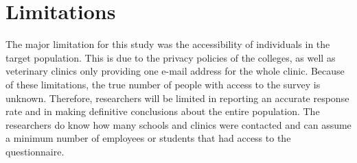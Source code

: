 \section{Limitations}

The major limitation for this study was the accessibility of individuals in the target population. This is due to the privacy policies of the colleges, as well as veterinary clinics only providing one e-mail address for the whole clinic. Because of these limitations, the true number of people with access to the survey is unknown. Therefore, researchers will be limited in reporting an accurate response rate and in making definitive conclusions about the entire population. The researchers do know how many schools and clinics were contacted and can assume a minimum number of employees or students that had access to the questionnaire.




